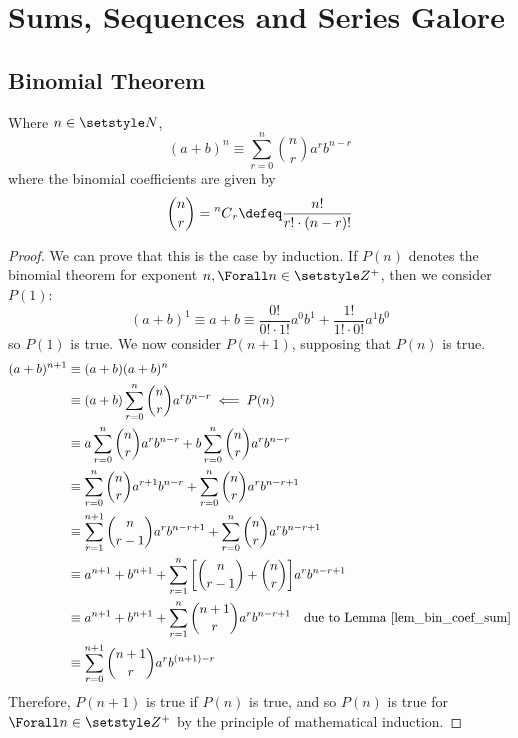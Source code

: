\section{Sums, Sequences and Series Galore}

\subsection{Binomial Theorem}

\begin{theorem} \label{thm_binomial_thm}
Where \(n \in \Naturals\),
\begin{equation*}
(a + b)^n \equiv \sum_{r = 0}^n \binom nr a^r b^{n - r}
\end{equation*}
where the binomial coefficients are given by
\begin{equation*}
\binom nr = \nCr nr \defeq \frac{n!}{r!\cdot(n - r)!}
\end{equation*}
\end{theorem}
\begin{proof}
We can prove that this is the case by induction. If \(P(n)\) denotes the
binomial theorem for exponent \(n, \Forall n \in \Integers^+\), then we
consider \(P(1)\):
\begin{equation*}
(a + b)^1 \equiv a + b
    \equiv \frac{0!}{0!\cdot 1!} a^0b^1 + \frac{1!}{1!\cdot 0!} a^1b^0
\end{equation*}
so \(P(1)\) is true. We now consider \(P(n + 1)\), supposing that \(P(n)\)
is true.
\begin{align*}
(a + b)^{n + 1} &\equiv (a + b)(a + b)^n \\
    &\equiv (a + b)\sum_{r = 0}^n \binom nr a^r b^{n - r}
        \impliedby P(n) \\
    &\equiv a\sum_{r = 0}^n \binom nr a^r b^{n - r}
          + b\sum_{r = 0}^n \binom nr a^r b^{n - r} \\
    &\equiv \sum_{r = 0}^n \binom nr a^{r + 1} b^{n - r}
          + \sum_{r = 0}^n \binom nr a^r b^{n - r + 1} \\
    &\equiv \sum_{r = 1}^{n + 1} \binom n{r - 1} a^r b^{n - r + 1}
          + \sum_{r = 0}^n \binom nr a^r b^{n - r + 1} \\
    &\equiv a^{n + 1} + b^{n + 1}
          + \sum_{r = 1}^n \bqty{\binom n{r - 1} + \binom nr}
            a^r b^{n - r + 1} \\
    &\equiv a^{n + 1} + b^{n + 1}
          + \sum_{r = 1}^n \binom{n + 1}r a^r b^{n - r + 1}
            \quad \text{due to Lemma \ref{lem_bin_coef_sum}} \\
    &\equiv \sum_{r = 0}^{n + 1} \binom{n + 1}r a^r b^{(n + 1) - r}
\end{align*}
Therefore, \(P(n + 1)\) is true if \(P(n)\) is true, and so \(P(n)\) is
true for \(\Forall n \in \Integers^+\) by the principle of mathematical
induction.
\end{proof}

